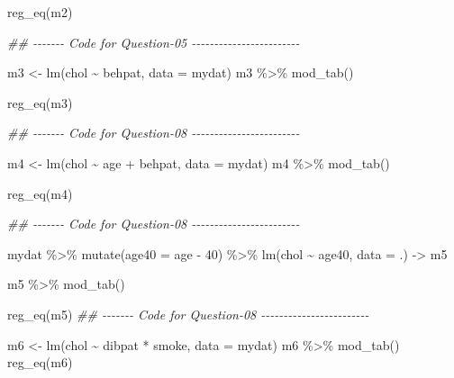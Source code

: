 \documentclass[
  12pt,
  oneside]{article}
\newenvironment{Shaded}{}{}
\newcommand{\AttributeTok}[1]{\textcolor[rgb]{0.49,0.56,0.16}{#1}}
\newcommand{\DecValTok}[1]{\textcolor[rgb]{0.25,0.63,0.44}{#1}}
\newcommand{\DocumentationTok}[1]{\textcolor[rgb]{0.73,0.13,0.13}{\textit{#1}}}
\newcommand{\FunctionTok}[1]{\textcolor[rgb]{0.02,0.16,0.49}{#1}}
\newcommand{\NormalTok}[1]{#1}
\newcommand{\OtherTok}[1]{\textcolor[rgb]{0.00,0.44,0.13}{#1}}
\newcommand{\SpecialCharTok}[1]{\textcolor[rgb]{0.25,0.44,0.63}{#1}}
\begin{document}
\begin{Shaded}
\begin{Highlighting}[]
\FunctionTok{reg\_eq}\NormalTok{(m2)}

\DocumentationTok{\#\# {-}{-}{-}{-}{-}{-}{-} Code for Question{-}05 {-}{-}{-}{-}{-}{-}{-}{-}{-}{-}{-}{-}{-}{-}{-}{-}{-}{-}{-}{-}{-}{-}{-}{-}}

\NormalTok{m3 }\OtherTok{\textless{}{-}} \FunctionTok{lm}\NormalTok{(chol }\SpecialCharTok{\textasciitilde{}}\NormalTok{ behpat, }\AttributeTok{data =}\NormalTok{ mydat)}
\NormalTok{m3 }\SpecialCharTok{\%\textgreater{}\%} \FunctionTok{mod\_tab}\NormalTok{()}

\FunctionTok{reg\_eq}\NormalTok{(m3)}

\DocumentationTok{\#\# {-}{-}{-}{-}{-}{-}{-} Code for Question{-}08 {-}{-}{-}{-}{-}{-}{-}{-}{-}{-}{-}{-}{-}{-}{-}{-}{-}{-}{-}{-}{-}{-}{-}{-}}

\NormalTok{m4 }\OtherTok{\textless{}{-}} \FunctionTok{lm}\NormalTok{(chol }\SpecialCharTok{\textasciitilde{}}\NormalTok{ age }\SpecialCharTok{+}\NormalTok{ behpat, }\AttributeTok{data =}\NormalTok{ mydat)}
\NormalTok{m4 }\SpecialCharTok{\%\textgreater{}\%} \FunctionTok{mod\_tab}\NormalTok{()}

\FunctionTok{reg\_eq}\NormalTok{(m4)}

\DocumentationTok{\#\# {-}{-}{-}{-}{-}{-}{-} Code for Question{-}08 {-}{-}{-}{-}{-}{-}{-}{-}{-}{-}{-}{-}{-}{-}{-}{-}{-}{-}{-}{-}{-}{-}{-}{-}}

\NormalTok{mydat }\SpecialCharTok{\%\textgreater{}\%} 
  \FunctionTok{mutate}\NormalTok{(}\AttributeTok{age40 =}\NormalTok{ age }\SpecialCharTok{{-}} \DecValTok{40}\NormalTok{) }\SpecialCharTok{\%\textgreater{}\%} 
  \FunctionTok{lm}\NormalTok{(chol }\SpecialCharTok{\textasciitilde{}}\NormalTok{ age40, }\AttributeTok{data =}\NormalTok{ .) }\OtherTok{{-}\textgreater{}}\NormalTok{ m5}

\NormalTok{m5 }\SpecialCharTok{\%\textgreater{}\%} \FunctionTok{mod\_tab}\NormalTok{()}

\FunctionTok{reg\_eq}\NormalTok{(m5)}
\DocumentationTok{\#\# {-}{-}{-}{-}{-}{-}{-} Code for Question{-}08 {-}{-}{-}{-}{-}{-}{-}{-}{-}{-}{-}{-}{-}{-}{-}{-}{-}{-}{-}{-}{-}{-}{-}{-}}

\NormalTok{m6 }\OtherTok{\textless{}{-}} \FunctionTok{lm}\NormalTok{(chol }\SpecialCharTok{\textasciitilde{}}\NormalTok{ dibpat }\SpecialCharTok{*}\NormalTok{ smoke, }\AttributeTok{data =}\NormalTok{ mydat)}
\NormalTok{m6 }\SpecialCharTok{\%\textgreater{}\%} \FunctionTok{mod\_tab}\NormalTok{()}
\FunctionTok{reg\_eq}\NormalTok{(m6)}
\end{Highlighting}
\end{Shaded}
\end{document}
